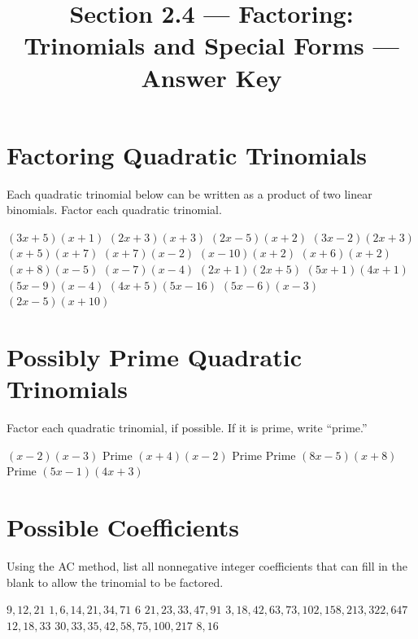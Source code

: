

\title{Section 2.4 --- Factoring: Trinomials and Special Forms --- Answer Key}

\newcommand{\squares}[3]{\begin{nmenum}\mitemxoxx{#1}{#2}{#3}\end{nmenum}}
\newcommand{\nos}{Not square}

\newcommand{\forms}[2]{\begin{nmenum}\mitemxx{#1}{#2}\end{nmenum}}
\newcommand{\dos}{Difference of Squares}
\newcommand{\sos}{Sum of Squares (prime)}
\newcommand{\doc}{Difference of Cubes}
\newcommand{\soc}{Sum of Cubes}
\newcommand{\nsf}{Not a special form}


\maketitle
\section*{Factoring Quadratic Trinomials}
Each quadratic trinomial below can be written as a product of two linear binomials.  Factor each quadratic trinomial.
\begin{smenum}
\mitemxxxx
{$(3x+5)(x+1)$}
{$(2x+3)(x+3)$}
{$(2x-5)(x+2)$}
{$(3x-2)(2x+3)$}
\mitemxxxx
{$(x+5)(x+7)$}
{$(x+7)(x-2)$}
{$(x-10)(x+2)$}
{$(x+6)(x+2)$}
\mitemxxxx
{$(x+8)(x-5)$}
{$(x-7)(x-4)$}
{$(2x+1)(2x+5)$}
{$(5x+1)(4x+1)$}
\mitemxxxx
{$(5x-9)(x-4)$}
{$(4x+5)(5x-16)$}
{$(5x-6)(x-3)$}
{$(2x-5)(x+10)$}
\end{smenum}

\section*{Possibly Prime Quadratic Trinomials}
Factor each quadratic trinomial, if possible.  If it is prime, write ``prime.''
\begin{smenum}
\mitemxxxx
{$(x-2)(x-3)$}
{Prime}
{$(x+4)(x-2)$}
{Prime}
\mitemxxxx
{Prime}
{$(8x-5)(x+8)$}
{Prime}
{$(5x-1)(4x+3)$}
\end{smenum}

\section*{Possible Coefficients}
Using the AC method, list all nonnegative integer coefficients that can fill in the blank to allow the trinomial to be factored.
\begin{smenum}
\mitemxxxx
{$9,12,21$}
{$1,6,14,21,34,71$}
{$6$}
{$21,23,33,47,91$}
\mitemxx
{$3,18,42,63,73,102,158,213,322,647$}
{$12,18,33$}
\mitemxx
{$30,33,35,42,58,75,100,217$}
{$8,16$}
\end{smenum}

